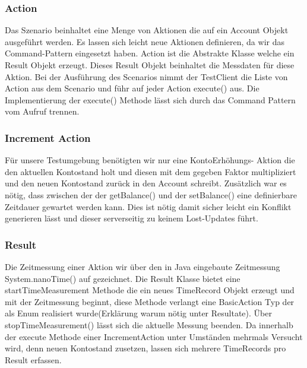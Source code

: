 \subsubsection{Action}
\label{sec:action}
Das Szenario beinhaltet eine Menge von Aktionen die auf ein Account Objekt ausgeführt werden.  Es lassen sich leicht neue Aktionen definieren, da wir das Command-Pattern eingesetzt haben. Action ist die Abstrakte Klasse welche ein Result Objekt erzeugt. Dieses Result Objekt beinhaltet die Messdaten für diese Aktion. Bei der Ausführung des Scenarios nimmt der TestClient die Liste von Action aus dem Scenario und führ auf jeder Action execute() aus. Die Implementierung der execute() Methode lässt sich durch das Command Pattern vom Aufruf trennen. 
\subsubsection{Increment Action}
\label{sec:incrementAction}
Für unsere Testumgebung benötigten wir nur eine KontoErhöhungs- Aktion die den aktuellen Kontostand holt und diesen mit dem gegeben Faktor multipliziert und den neuen Kontostand zurück in den Account schreibt. Zusätzlich war es nötig, dass zwischen der der getBalance() und der setBalance() eine definierbare Zeitdauer gewartet werden kann. Dies ist nötig damit sicher leicht ein Konflikt generieren lässt und dieser serverseitig zu keinem Lost-Updates führt.

\subsubsection{Result}
\label{sec:result}
Die Zeitmessung einer Aktion wir über den in Java eingebaute Zeitmessung System.nanoTime() auf gezeichnet. Die Result Klasse bietet eine startTimeMeasurement Methode die ein neues TimeRecord Objekt erzeugt und mit der Zeitmessung beginnt, diese Methode verlangt eine BasicAction Typ der als Enum realisiert wurde(Erklärung warum nötig unter Resultate). Über stopTimeMeasurement() lässt sich die aktuelle Messung beenden. Da innerhalb der execute Methode einer IncrementAction unter Umständen mehrmals Versucht wird, denn neuen Kontostand zusetzen, lassen sich mehrere TimeRecords pro Result erfassen.


